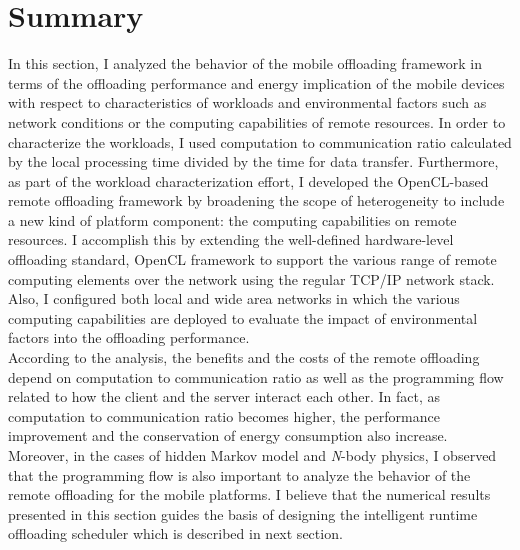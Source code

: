 \section{Summary}
\label{character:summary}
%
In this section, I analyzed the behavior of the mobile offloading
framework in terms of the offloading performance and energy implication
of the mobile devices with respect to characteristics of workloads and
environmental factors such as network conditions or the computing
capabilities of remote resources.
%
In order to characterize the workloads, I used computation to
communication ratio calculated by the local processing time divided by
the time for data transfer.
%
Furthermore, as part of the workload characterization effort, I
developed the OpenCL-based remote offloading framework by broadening the
scope of heterogeneity to include a new kind of platform component: the
computing capabilities on remote resources. 
%
I accomplish this by extending the well-defined hardware-level
offloading standard, OpenCL framework to support the various range of
remote computing elements over the network using the regular TCP/IP
network stack.
%
Also, I configured both local and wide area networks in which the
various computing capabilities are deployed to evaluate the impact of
environmental factors into the offloading performance.\\
%
According to the analysis, the benefits and the costs of the remote
offloading depend on computation to communication ratio as well as the
programming flow related to how the client and the server interact each
other.
%
In fact, as computation to communication ratio becomes higher, 
the performance improvement and the conservation of energy consumption 
also increase.
%
Moreover, in the cases of hidden Markov model and {\it N}-body
physics, I observed that the programming flow is also important to
analyze the behavior of the remote offloading for the mobile
platforms.  
%
I believe that the numerical results presented in this section guides the basis
of designing the intelligent runtime offloading scheduler which is
described in next section.
